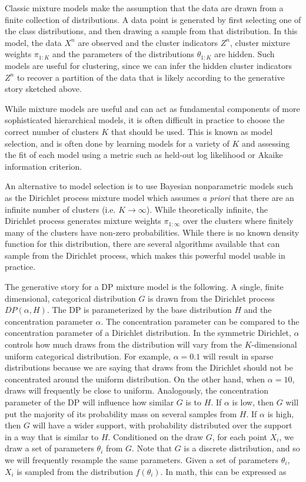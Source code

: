 Classic mixture models make the assumption that the data are drawn
from a finite collection of distributions. A data point is generated
by first selecting one of the class distributions, and then drawing a
sample from that distribution. In this model, the data $X^n$ are
observed and the cluster indicators $Z^n$, cluster mixture weights
$\pi_{1:K}$ and the parameters of the distributions $\theta_{1:K}$ are
hidden. Such models are useful for clustering, since we can infer the
hidden cluster indicators $Z^n$ to recover a partition of the data
that is likely according to the generative story sketched above.

While mixture models are useful and can act as fundamental components
of more sophisticated hierarchical models, it is often difficult in
practice to choose the correct number of clusters $K$ that should be
used. This is known as model selection, and is often done by learning
models for a variety of $K$ and assessing the fit of each model using
a metric such as held-out log likelihood or Akaike information
criterion.

An alternative to model selection is to use Bayesian nonparametric
models such as the Dirichlet process mixture model \cite{antoniak1974}
which assumes \textit{a priori} that there are an infinite number of
clusters (i.e. $K \to \infty$). While theoretically infinite, the
Dirichlet process generates mixture weights $\pi_{1:\infty}$ over the
clusters where finitely many of the clusters have non-zero
probabilities. While there is no known density function for this
distribution, there are several algorithms available that can sample
from the Dirichlet process, which makes this powerful model usable in
practice.

The generative story for a DP mixture model is the following. A
single, finite dimensional, categorical distribution $G$ is drawn from
the Dirichlet process $DP(\alpha, H)$. The DP is parameterized by the
base distribution $H$ and the concentration parameter $\alpha$. The
concentration parameter can be compared to the concentration parameter
of a Dirichlet distribution. In the symmetric Dirichlet, $\alpha$
controls how much draws from the distribution will vary from the
$K$-dimensional uniform categorical distribution. For example, $\alpha
= 0.1$ will result in sparse distributions because we are saying that
draws from the Dirichlet should not be concentrated around the uniform
distribution. On the other hand, when $\alpha = 10$, draws will
frequently be close to uniform. Analogously, the concentration
parameter of the DP will influence how similar $G$ is to $H$. If
$\alpha$ is low, then $G$ will put the majority of its probability
mass on several samples from $H$. If $\alpha$ is high, then $G$ will
have a wider support, with probability distributed over the support in
a way that is similar to $H$. Conditioned on the draw $G$, for each
point $X_i$, we draw a set of parameters $\theta_i$ from $G$. Note
that $G$ is a discrete distribution, and so we will frequently
resample the same parameters. Given a set of parameters $\theta_i$,
$X_i$ is sampled from the distribution $f(\theta_i)$. In math, this
can be expressed as

